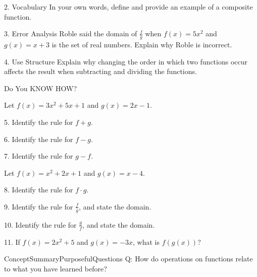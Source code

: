 \documentclass{article}
\newenvironment{concept-summary}{}{}    %
\newenvironment{te-addendum}[2]{}{}     %
\newcommand{\answer}[1]{}               %
\begin{document}
\begin{concept-summary}
2. Vocabulary In your own words, define and provide an example of a composite function.
\answer{A composite function is a method of combining functions such that the output of one function is the input of the other function. Example: Given \(f(x)=2x\) and \(g(x)=x+1\), the composite function \(f\circ g=f(g(x))=2(x+1)=2x+2\).}

3. Error Analysis Roble said the domain of \(\frac{f}{g}\) when \(f(x)=5x^2\) and \(g(x)=x+3\) is the set of real numbers. Explain why Roble is incorrect.
\answer{The domain is all real numbers except \(x=-3\), for which \(g(x)\) is equal to 0. \(g(x)\) is in the denominator, so when \(x=-3\), \(\frac{f}{g}\) is undefined.}

4. Use Structure Explain why changing the order in which two functions occur affects the result when subtracting and dividing the functions.
\answer{The operations of subtraction and division are not commutative.}

Do You KNOW HOW?

Let \(f(x)=3x^2+5x+1\) and \(g(x)=2x-1\).

5. Identify the rule for \(f+g\).
\answer{\(3x^2+7x\).}

6. Identify the rule for \(f-g\).
\answer{\(3x^2+3x+2\).}

7. Identify the rule for \(g-f\).
\answer{\(-3x^2-3x-2\).}

Let \(f(x)=x^2+2x+1\) and \(g(x)=x-4\).

8. Identify the rule for \(f\cdot g\).
\answer{\(x^3-2x^2-7x-4\).}

9. Identify the rule for \(\frac{f}{g}\), and state the domain.
\answer{\(\frac{x^2+2x+1}{x-4}\) for all real numbers \(x\), such that \(x\ne 4\).}

10. Identify the rule for \(\frac{g}{f}\), and state the domain.
\answer{\(\frac{x-4}{x^2+2x+1}\), or \(\frac{x-4}{(x+1)^2}\), for all real numbers \(x\), when \(x\ne -1\).}

11. If \(f(x)=2x^2+5\) and \(g(x)=-3x\), what is \(f(g(x))\)?
\answer{\(18x^2+5\).}
\end{concept-summary}

\begin{te-addendum}{ConceptSummary}{PurposefulQuestions}
Q: How do operations on functions relate to what you have learned before?
\answer{Performing operations on functions is very similar to performing operations on integers, rational numbers, and polynomials.}
\end{te-addendum}
\end{document}
